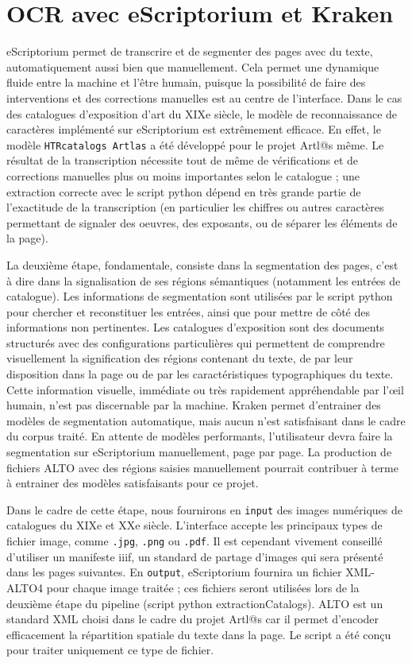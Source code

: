 \documentclass[a4paper,12pt,twoside]{book}
\begin{document}
\section{OCR avec eScriptorium et Kraken}

eScriptorium permet de transcrire et de segmenter des pages avec du texte, automatiquement aussi bien que manuellement. Cela permet une dynamique fluide entre la machine et l'être humain, puisque la possibilité de faire des interventions et des corrections manuelles est au centre de l'interface. Dans le cas des catalogues d'exposition d'art du XIXe siècle, le modèle de reconnaissance de caractères implémenté sur eScriptorium est extrêmement efficace. En effet, le modèle \texttt{HTRcatalogs Artlas} a été développé pour le projet Artl@s même. Le résultat de la transcription nécessite tout de même de vérifications et de corrections manuelles plus ou moins importantes selon le catalogue ; une extraction correcte avec le script python dépend en très grande partie de l'exactitude de la transcription (en particulier les chiffres ou autres caractères permettant de signaler des oeuvres, des exposants, ou de séparer les éléments de la page). 

La deuxième étape, fondamentale, consiste dans la segmentation des pages, c'est à dire dans la signalisation de ses régions sémantiques (notamment les entrées de catalogue). Les informations de segmentation sont utilisées par le script python pour chercher et reconstituer les entrées, ainsi que pour mettre de côté des informations non pertinentes. Les catalogues d'exposition sont des documents structurés avec des configurations particulières qui permettent de comprendre visuellement la signification des régions contenant du texte, de par leur disposition dans la page ou de par les caractéristiques typographiques du texte. Cette information visuelle, immédiate ou très rapidement appréhendable par l'œil humain, n'est pas discernable par la machine. Kraken permet d'entrainer des modèles de segmentation automatique, mais aucun n'est satisfaisant dans le cadre du corpus traité. En attente de modèles performants, l'utilisateur devra faire la segmentation sur eScriptorium manuellement, page par page. La production de fichiers ALTO avec des régions saisies manuellement pourrait contribuer à terme à entrainer des modèles satisfaisants pour ce projet.

Dans le cadre de cette étape, nous fournirons en \texttt{input} des images numériques de catalogues du XIXe et XXe siècle. L'interface accepte les principaux types de fichier image, comme \texttt{.jpg}, \texttt{.png} ou  \texttt{.pdf}. Il est cependant vivement conseillé d'utiliser un manifeste iiif, un standard de partage d'images qui sera présenté dans les pages suivantes.
En \texttt{output}, eScriptorium fournira un fichier XML-ALTO4 pour chaque image traitée ; ces fichiers seront utilisées lors de la deuxième étape du pipeline (script python extractionCatalogs). ALTO est un standard XML choisi dans le cadre du projet Artl@s car il permet d'encoder efficacement la répartition spatiale du texte dans la page. Le script a été conçu pour traiter uniquement ce type de fichier. 
\end{document}
